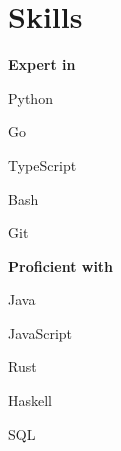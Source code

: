 \documentclass[]{resume}
\begin{document}
\begin{minipage}[t]{0.33\textwidth}
\sectionsep \section{Skills}
\textbf{Expert in}
\vspace{\topsep} %
\begin{tightemize}
\item Python
\item Go
\item TypeScript
\item Bash
\item Git
\end{tightemize}
\sectionsep
\textbf{Proficient with}
\begin{tightemize}
\item Java
\item JavaScript
\item Rust
\item Haskell
\item SQL
\end{tightemize}
\sectionsep


\end{minipage}
\hfill
\end{document}
